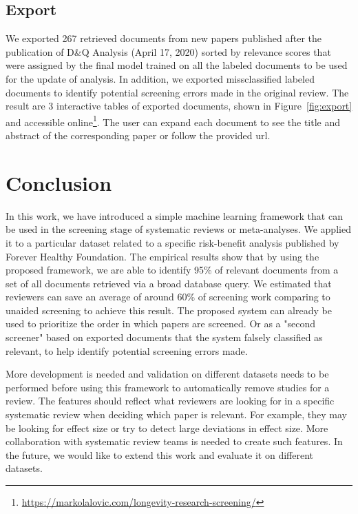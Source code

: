 \documentclass[10pt,twocolumn,letterpaper]{article}
\begin{document}
\subsection{Export}
We exported 267 retrieved documents from new papers published after the publication of D\&Q Analysis (April 17, 2020) sorted by relevance scores that were assigned by the final model trained on all the labeled documents to be used for the update of analysis. In addition, we exported missclassified labeled documents to identify potential screening errors made in the original review. The result are 3 interactive tables of exported documents, shown in Figure~\ref{fig:export} and accessible online\footnote{\url{https://markolalovic.com/longevity-research-screening/}}. The user can expand each document to see the title and abstract of the corresponding paper or follow the provided url.

\section{Conclusion}
In this work, we have introduced a simple machine learning framework that can be used in the screening stage of systematic reviews or meta-analyses. We applied it to a particular dataset related to a specific risk-benefit analysis published by Forever Healthy Foundation. The empirical results show that by using the proposed framework, we are able to identify 95\% of relevant documents from a set of all documents retrieved via a broad database query. We estimated that reviewers can save an average of around 60\% of screening work comparing to unaided screening to achieve this result. The proposed system can already be used to prioritize the order in which papers are screened. Or as a "second screener" based on exported documents that the system falsely classified as relevant, to help identify potential screening errors made.

More development is needed and validation on different datasets needs to be performed before using this framework to automatically remove studies for a review. The features should reflect what reviewers are looking for in a specific systematic review when deciding which paper is relevant. For example, they may be looking for effect size or try to detect large deviations in effect size. More collaboration with systematic review teams is needed to create such features. In the future, we would like to extend this work and evaluate it on different datasets.



\end{document}
